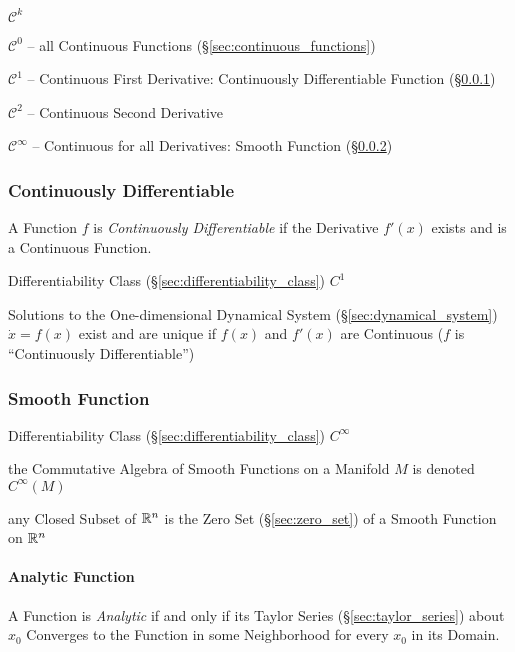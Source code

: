 $\mathcal{C}^k$

$\mathcal{C}^0$ -- all Continuous Functions (\S\ref{sec:continuous_functions})

$\mathcal{C}^1$ -- Continuous First Derivative: Continuously Differentiable
Function (\S\ref{sec:continuously_differentiable})

$\mathcal{C}^2$ -- Continuous Second Derivative

$\mathcal{C}^\infty$ -- Continuous for all Derivatives: Smooth Function
(\S\ref{sec:smooth_function})



\subsubsection{Continuously Differentiable}
\label{sec:continuously_differentiable}

A Function $f$ is \emph{Continuously Differentiable} if the Derivative $f'(x)$
exists and is a Continuous Function.

Differentiability Class (\S\ref{sec:differentiability_class}) $C^1$

Solutions to the One-dimensional Dynamical System
(\S\ref{sec:dynamical_system}) $\dot{x} = f(x)$ exist and are unique if $f(x)$
and $f'(x)$ are Continuous ($f$ is ``Continuously Differentiable'')



\subsubsection{Smooth Function}\label{sec:smooth_function}

Differentiability Class (\S\ref{sec:differentiability_class}) $C^{\infty}$

the Commutative Algebra of Smooth Functions on a Manifold $M$ is denoted
$C^\infty(M)$ %

any Closed Subset of $\mathbb{R}^n$ is the Zero Set (\S\ref{sec:zero_set}) of a
Smooth Function on $\mathbb{R}^n$



\paragraph{Analytic Function}\label{sec:analytic_function}\hfill

A Function is \emph{Analytic} if and only if its Taylor Series
(\S\ref{sec:taylor_series}) about $x_0$ Converges to the Function in some
Neighborhood for every $x_0$ in its Domain.

